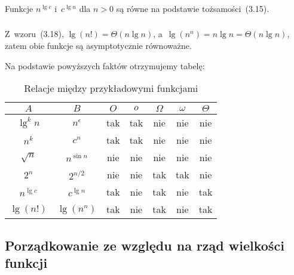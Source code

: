 \subsubsection{} %
Funkcje $n^{\lg c}$ i~$c^{\lg n}$ dla $n>0$ są równe na podstawie tożsamości~(3.15).

\subsubsection{} %
Z~wzoru~(3.18), $\lg(n!)=\Theta(n\lg n)$, a~$\lg(n^n)=n\lg n=\Theta(n\lg n)$, zatem obie funkcje są asymptotycznie równoważne.

\bigskip
\noindent Na podstawie powyższych faktów otrzymujemy tabelę:
\begin{table}[ht]
	\begin{center}
		\begin{tabular}{cc|c|c|c|c|c|}
			$A$ & $B$ & $O$ & $o$ & $\Omega$ & $\omega$ & $\Theta$ \\
			\hline
			$\lg^kn$ & $n^\epsilon$ & tak & tak & nie & nie & nie \\
			\hline
			$n^k$ & $c^n$ & tak & tak & nie & nie & nie \\
			\hline
			$\sqrt{n}$ & $n^{\sin n}$ & nie & nie & nie & nie & nie \\
			\hline
			$2^n$ & $2^{n/2}$ & nie & nie & tak & tak & nie \\
			\hline
			$n^{\lg c}$ & $c^{\lg n}$ & tak & nie & tak & nie & tak \\
			\hline
			$\lg(n!)$ & $\lg(n^n)$ & tak & nie & tak & nie & tak \\
			\hline
		\end{tabular}
		\caption{Relacje między przykładowymi funkcjami}
	\end{center}
\end{table}

\subsection{Porządkowanie ze względu na rząd wielkości funkcji} %

